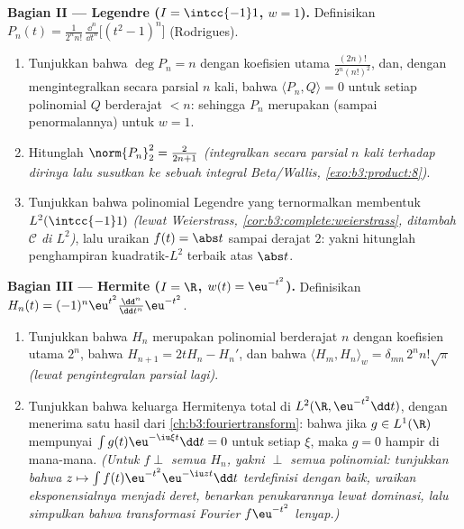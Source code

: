 \begin{problem}
\medskip
\noindent\textbf{Bagian II --- Legendre ($I = \intcc{-1}1$, $w =
1$).} Definisikan $P_n(t) = \frac{1}{2^nn!}\,\frac{\dd^n}{\dd
t^n}\bigl[(t^2 - 1)^n\bigr]$ (Rodrigues).
\begin{enumerate}[resume]
  \item Tunjukkan bahwa $\deg P_n = n$ dengan koefisien utama
        $\frac{(2n)!}{2^n(n!)^2}$, dan, dengan mengintegralkan secara parsial
        $n$ kali, bahwa $\langle P_n, Q\rangle = 0$ untuk setiap
        polinomial $Q$ berderajat $< n$: sehingga $P_n$ merupakan (sampai
        penormalannya)  untuk $w = 1$.
  \item Hitunglah $\norm{P_n}_2^2 = \frac{2}{2n+1}$
        \emph{(integralkan secara parsial $n$ kali terhadap dirinya lalu
        susutkan ke sebuah integral Beta/Wallis,
        \cref{exo:b3:product:8})}.
  \item Tunjukkan bahwa polinomial Legendre yang ternormalkan membentuk
         $L^2(\intcc{-1}1)$
        \emph{(lewat Weierstrass, \cref{cor:b3:complete:weierstrass},
        ditambah  $\mathcal C$ di $L^2$)}, lalu uraikan
        $f(t) = \abs t$ sampai derajat $2$: yakni hitunglah penghampiran
        kuadratik-$L^2$ terbaik atas $\abs t$.
\end{enumerate}

\medskip
\noindent\textbf{Bagian III --- Hermite ($I = \R$, $w(t) =
\eu^{-t^2}$).} Definisikan $H_n(t) =
(-1)^n\eu^{t^2}\frac{\dd^n}{\dd t^n}\eu^{-t^2}$.
\begin{enumerate}[resume]
  \item Tunjukkan bahwa $H_n$ merupakan polinomial berderajat $n$ dengan
        koefisien utama $2^n$, bahwa $H_{n+1} = 2tH_n -
        H_n'$, dan bahwa $\langle H_m, H_n\rangle_w =
        \delta_{mn}\,2^nn!\sqrt\pi$ \emph{(lewat pengintegralan parsial lagi)}.
  \item Tunjukkan bahwa keluarga Hermitenya total di $L^2(\R,
        \eu^{-t^2}\dd t)$, dengan menerima satu hasil dari
        \cref{ch:b3:fouriertransform}: bahwa jika $g \in L^1(\R)$ mempunyai
        $\int g(t)\eu^{-\iu\xi t}\dd t = 0$ untuk setiap $\xi$,
        maka $g = 0$ hampir di mana-mana. \emph{(Untuk $f \perp$ semua $H_n$,
        yakni $\perp$ semua polinomial: tunjukkan bahwa $z \mapsto \int
        f(t)\eu^{-t^2}\eu^{-\iu zt}\dd t$ terdefinisi dengan baik,
        uraikan eksponensialnya menjadi deret, benarkan
        penukarannya lewat dominasi, lalu simpulkan bahwa
        transformasi Fourier $f\eu^{-t^2}$ lenyap.)}
\end{enumerate}


\end{problem}
